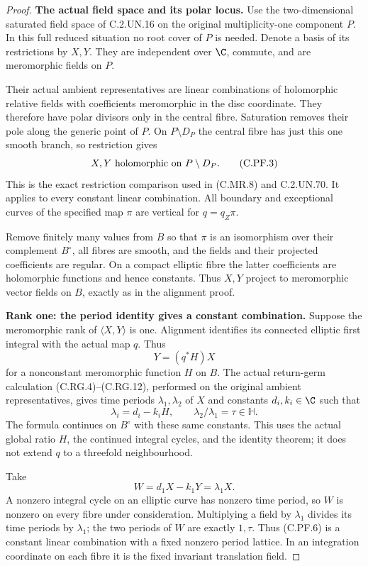 \begin{proof}
\par\medskip\noindent\textbf{The actual field space and its polar locus.}
Use the two-dimensional saturated field space of
C.2.UN.16 on the original multiplicity-one component
\(P\). In this full reduced situation no root cover
of \(P\) is needed. Denote a basis of its restrictions
by \(X,Y\). They are independent over \(\C\), commute,
and are meromorphic fields on \(P\).

Their actual ambient representatives are linear
combinations of holomorphic relative fields with
coefficients meromorphic in the disc coordinate.
They therefore have polar divisors only in the
central fibre. Saturation removes their pole along
the generic point of \(P\). On \(P\setminus D_P\)
the central fibre has just this one smooth branch,
so restriction gives
\[
       X,Y\ \hbox{holomorphic on }P\setminus D_P .
 \tag{C.PF.3}
\]
This is the exact restriction comparison used in
(C.MR.8) and C.2.UN.70. It applies to every constant
linear combination. All boundary and exceptional
curves of the specified map \(\pi\) are vertical
for \(q=q_Z\pi\).

Remove finitely many values from \(B\) so that
\(\pi\) is an isomorphism over their complement
\(B^\circ\), all fibres are smooth, and the fields
and their projected coefficients are regular.
On a compact elliptic fibre the latter coefficients
are holomorphic functions and hence constants.
Thus \(X,Y\) project to meromorphic vector fields
on \(B\), exactly as in the alignment proof.

\par\medskip\noindent\textbf{Rank one: the period identity gives a constant combination.}
Suppose the meromorphic rank of \(\langle X,Y\rangle\)
is one. Alignment identifies its connected elliptic
first integral with the actual map \(q\). Thus
\[
                       Y=(q^*H)X
 \tag{C.PF.4}
\]
for a nonconstant meromorphic function \(H\) on
\(B\). The actual return-germ calculation
(C.RG.4)--(C.RG.12), performed on the original
ambient representatives, gives time periods
\(\lambda_1,\lambda_2\) of \(X\) and constants
\(d_i,k_i\in\C\) such that
\[
            \lambda_i=d_i-k_iH,\qquad
            \lambda_2/\lambda_1=\tau\in\mathbb H .
 \tag{C.PF.5}
\]
The formula continues on \(B^\circ\) with these
same constants. This uses the actual global ratio
\(H\), the continued integral cycles, and the
identity theorem; it does not extend \(q\) to a
threefold neighbourhood.

Take
\[
                       W=d_1X-k_1Y=\lambda_1X.
 \tag{C.PF.6}
\]
A nonzero integral cycle on an elliptic curve has
nonzero time period, so \(W\) is nonzero on every
fibre under consideration. Multiplying a field by
\(\lambda_1\) divides its time periods by
\(\lambda_1\); the two periods of \(W\) are exactly
\(1,\tau\). Thus (C.PF.6) is a constant linear
combination with a fixed nonzero period lattice.
In an integration coordinate on each fibre it
is the fixed invariant translation field.


\end{proof}
